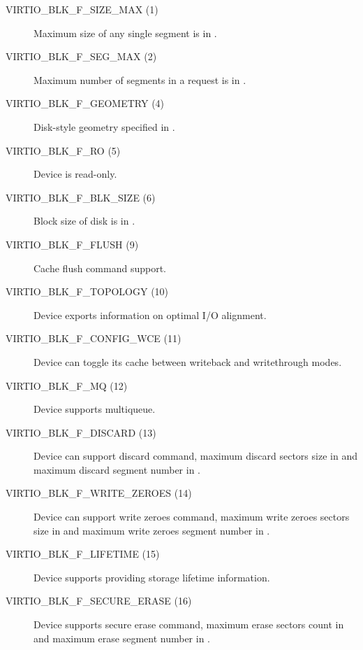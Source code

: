 \begin{description}
\item[VIRTIO_BLK_F_SIZE_MAX (1)] Maximum size of any single segment is
    in .

\item[VIRTIO_BLK_F_SEG_MAX (2)] Maximum number of segments in a
    request is in .

\item[VIRTIO_BLK_F_GEOMETRY (4)] Disk-style geometry specified in
    .

\item[VIRTIO_BLK_F_RO (5)] Device is read-only.

\item[VIRTIO_BLK_F_BLK_SIZE (6)] Block size of disk is in .

\item[VIRTIO_BLK_F_FLUSH (9)] Cache flush command support.

\item[VIRTIO_BLK_F_TOPOLOGY (10)] Device exports information on optimal I/O
    alignment.

\item[VIRTIO_BLK_F_CONFIG_WCE (11)] Device can toggle its cache between writeback
    and writethrough modes.

\item[VIRTIO_BLK_F_MQ (12)] Device supports multiqueue.

\item[VIRTIO_BLK_F_DISCARD (13)] Device can support discard command, maximum
    discard sectors size in  and maximum discard
    segment number in .

\item[VIRTIO_BLK_F_WRITE_ZEROES (14)] Device can support write zeroes command,
     maximum write zeroes sectors size in  and
     maximum write zeroes segment number in .

\item[VIRTIO_BLK_F_LIFETIME (15)] Device supports providing storage lifetime
     information.

\item[VIRTIO_BLK_F_SECURE_ERASE (16)] Device supports secure erase command,
     maximum erase sectors count in  and
     maximum erase segment number in .

\end{description}

